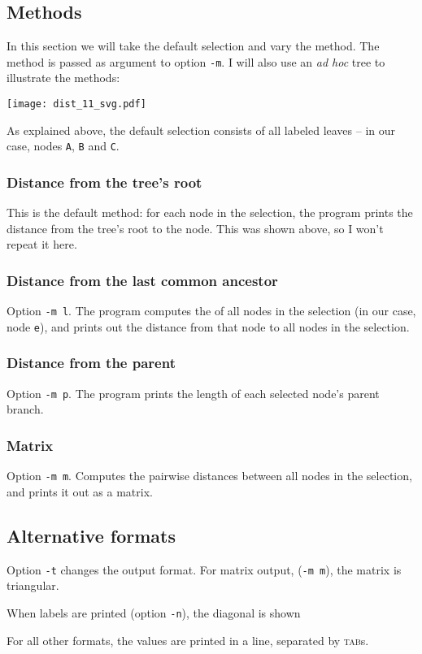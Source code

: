 \subsection{Methods}

In this section we will take the default selection and vary the method. The
method is passed as argument to option \texttt{-m}. I will also use an
\emph{ad hoc} tree to illustrate the methods:


\begin{center}
\texttt{[image: dist\_11\_svg.pdf]}
\end{center}

\noindent{}As explained above, the default selection consists of all labeled
leaves -- in our case, nodes \texttt{A}, \texttt{B} and \texttt{C}. 

\subsubsection{Distance from the tree's root}

This is the default method: for each node in the selection, the program prints
the distance from the tree's root to the node. This was shown above, so I
won't repeat it here.

\subsubsection{Distance from the last common ancestor}
Option \texttt{-m l}. The program computes the \lca{} of all nodes in the
selection (in our case, node \texttt{e}), and prints out the distance from
that node to all nodes in the selection.



\subsubsection{Distance from the parent}
Option \texttt{-m p}. The program prints the length of each selected node's
parent branch.



\subsubsection{Matrix}
Option \texttt{-m m}. Computes the pairwise distances between all nodes in the
selection, and prints it out as a matrix.



\subsection{Alternative formats}

Option \texttt{-t} changes the output format. For matrix output, (\texttt{-m
m}), the matrix is triangular. 


When labels are printed (option \texttt{-n}), the diagonal is shown



For all other formats, the values are printed in a line, separated by
\textsc{tab}s.


